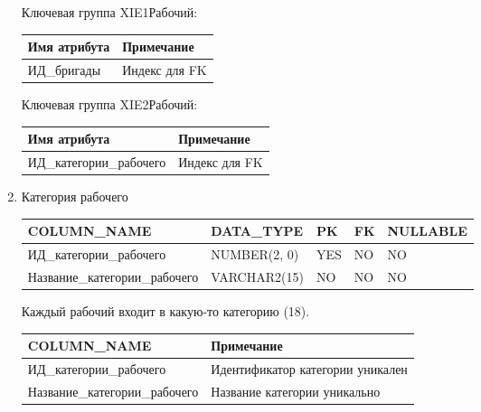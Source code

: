 \begin{enumerate}
\begin{tabular}{|p{4cm}|p{5cm}|}
    \end{tabular}

    Ключевая группа XIE1Рабочий:

    \begin{tabular}{|p{4cm}|p{5cm}|} \hline

        {\bf Имя атрибута} & {\bf Примечание} \\ \hline
        ИД\_бригады & Индекс для FK \\ \hline

    \end{tabular}

    Ключевая группа XIE2Рабочий:

    \begin{tabular}{|p{4cm}|p{5cm}|} \hline

        {\bf Имя атрибута} & {\bf Примечание} \\ \hline
        ИД\_категории\_рабочего & Индекс для FK \\ \hline

    \end{tabular}

    \item{Категория рабочего}

    \begin{tabular}{|p{4cm}|p{3cm}|p{1cm}|p{1cm}|p{2cm}|} \hline

        {\bf COLUMN\_NAME} & {\bf DATA\_TYPE} & {\bf PK} & {\bf FK} & {\bf NULLABLE} \\ \hline
        ИД\_категории\_рабочего & NUMBER(2, 0) & YES & NO & NO \\ \hline
        Название\_категории\_рабочего & VARCHAR2(15) & NO & NO & NO \\ \hline

    \end{tabular}

    Каждый рабочий входит в какую-то категорию (18).

    \begin{tabular}{|p{4cm}|p{5cm}|} \hline

        {\bf COLUMN\_NAME} & {\bf Примечание} \\ \hline
        ИД\_категории\_рабочего & Идентификатор категории уникален \\ \hline
        Название\_категории\_рабочего & Название категории уникально \\ \hline

    \end{tabular}


\end{enumerate}
